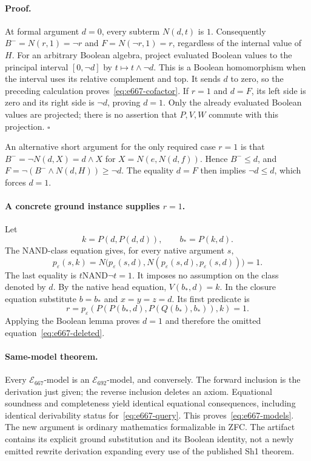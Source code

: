 \paragraph{Proof.}
At formal argument $d=0$, every subterm $N(d,t)$ is $1$.
Consequently $B^-=N(r,1)=\neg r$ and
$F=N(\neg r,1)=r$, regardless of the internal value of $H$.
For an arbitrary Boolean algebra, project evaluated Boolean values
to the principal interval $[0,\neg d]$ by $t\mapsto t\wedge\neg d$.
This is a Boolean homomorphism when the interval uses its relative
complement and top.  It sends $d$ to zero, so the preceding
calculation proves~\eqref{eq:e667-cofactor}.
If $r=1$ and $d=F$, its left side is zero and its right side is
$\neg d$, proving $d=1$.
Only the already evaluated Boolean values are projected;
there is no assertion that $P,V,W$ commute with this projection.
\hfill$\square$

An alternative short argument for the only required case $r=1$
is that $B^-=\neg N(d,X)=d\wedge X$ for
$X=N(e,N(d,f))$.  Hence $B^-\leq d$, and
$F=\neg(B^-\wedge N(d,H))\geq\neg d$.  The equality $d=F$
then implies $\neg d\leq d$, which forces $d=1$.

\paragraph{A concrete ground instance supplies $r=1$.}
Let
\[
                  k=P(d,P(d,d)),\qquad b_*=P(k,d).
\]
The NAND-class equation gives, for every native argument $s$,
\[
 p_\varepsilon(s,k)
 =N\bigl(p_\varepsilon(s,d),
           N(p_\varepsilon(s,d),p_\varepsilon(s,d))\bigr)=1.
\]
The last equality is $t\mathbin{\mathrm{NAND}}\neg t=1$.
It imposes no assumption on the class denoted by $d$.
By the native head equation, $V(b_*,d)=k$.  In the closure
equation substitute $b=b_*$ and $x=y=z=d$.  Its first predicate is
\[
 r=p_\varepsilon(P(P(b_*,d),P(Q(b_*),b_*)),k)=1.
\]
Applying the Boolean lemma proves $d=1$ and therefore the omitted
equation~\eqref{eq:e667-deleted}.

\paragraph{Same-model theorem.}
Every $\mathcal E_{667}$-model is an $\mathcal E_{692}$-model,
and conversely.  The forward inclusion is the derivation just
given; the reverse inclusion deletes an axiom.  Equational
soundness and completeness yield identical equational consequences,
including identical derivability status for~\eqref{eq:e667-query}.
This proves~\eqref{eq:e667-models}.  The new argument is ordinary
mathematics formalizable in ZFC.  The artifact contains its explicit
ground substitution and its Boolean identity, not a newly emitted
rewrite derivation expanding every use of the published Sh1 theorem.

